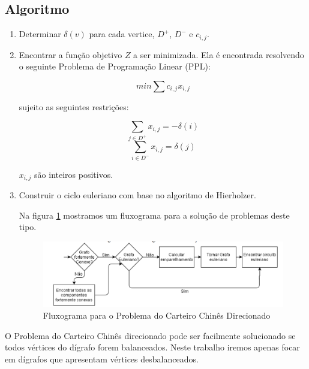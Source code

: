 \documentclass[a4paper, 12pt]{article}
\begin{document}
	
	\subsection{Algoritmo}
	
	\begin{enumerate}
		\item Determinar $\delta(v)$ para cada vertice, $D^+$, $D^-$ e $c_{i,j}$.
		
		\item Encontrar a função objetivo $Z$ a ser minimizada. Ela é encontrada resolvendo o seguinte Problema de Programação Linear (PPL):
		
		$$min \sum c_{i,j}x_{i,j}$$
		
		sujeito as seguintes restrições:
		
		$$\sum_{j\in D^+}x_{i,j}=-\delta(i)$$
		$$\sum_{i\in D^-}x_{i,j}=\delta(j)$$
		\begin{flushright}
			$x_{i,j}$ são inteiros positivos.
		\end{flushright}
		
		\item Construir o ciclo euleriano com base no algoritmo de Hierholzer.
		
		
		Na figura \ref{fig:fluxogramaPCCD} mostramos um fluxograma para a solução de problemas deste tipo.
		
		\begin{figure}[H]
			\centering
			\includegraphics[width=14cm]{img/fluxograma para PCCD.png}
			\caption{Fluxograma para o Problema do Carteiro Chinês Direcionado}
			\label{fig:fluxogramaPCCD}
		\end{figure}	
	\end{enumerate}
O Problema do Carteiro Chinês direcionado pode ser facilmente solucionado se todos vértices do dígrafo forem balanceados. Neste trabalho iremos apenas focar em dígrafos que apresentam vértices desbalanceados.
	
\end{document}
